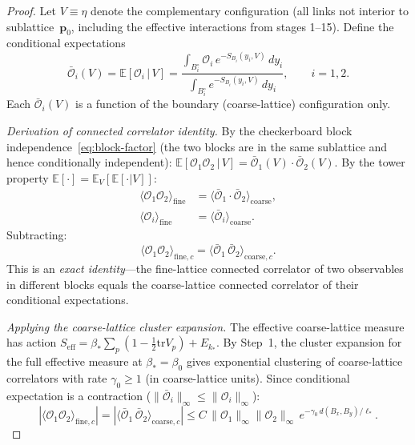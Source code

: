 \documentclass[11pt]{article}
\theoremstyle{definition}
\newcommand{\tr}{\mathrm{tr}}
\begin{document}
\begin{proof}
Let $V\equiv\eta$ denote the complementary configuration
(all links not interior to sublattice~$\mathbf{p}_0$,
including the effective interactions from stages 1--15).
Define the conditional expectations
\begin{equation}
\bar{\mathcal{O}}_i(V)
=\mathbb{E}[\mathcal{O}_i\,|\,V]
=\frac{\int_{B_i^\circ}\mathcal{O}_i\,
e^{-S_{B_i}(y_i,V)}\,dy_i}
{\int_{B_i^\circ}e^{-S_{B_i}(y_i,V)}\,dy_i},
\qquad i=1,2.
\end{equation}
Each $\bar{\mathcal{O}}_i(V)$ is a function of the boundary
(coarse-lattice) configuration only.

\emph{Derivation of connected correlator identity.}
By the checkerboard block independence~\eqref{eq:block-factor}
(the two blocks are in the same sublattice and hence
conditionally independent):
$\mathbb{E}[\mathcal{O}_1\mathcal{O}_2\,|\,V]
=\bar{\mathcal{O}}_1(V)\cdot\bar{\mathcal{O}}_2(V)$.
By the tower property
$\mathbb{E}[\cdot]=\mathbb{E}_V[\mathbb{E}[\cdot|V]]$:
\begin{align}
\langle\mathcal{O}_1\mathcal{O}_2\rangle_{\mathrm{fine}}
&=\langle\bar{\mathcal{O}}_1\cdot\bar{\mathcal{O}}_2
\rangle_{\mathrm{coarse}},\label{eq:tower-prod}\\
\langle\mathcal{O}_i\rangle_{\mathrm{fine}}
&=\langle\bar{\mathcal{O}}_i\rangle_{\mathrm{coarse}}.
\label{eq:tower-single}
\end{align}
Subtracting:
\begin{equation}\label{eq:fine-to-coarse}
\langle\mathcal{O}_1\mathcal{O}_2\rangle_{\mathrm{fine},c}
=\langle\bar{\mathcal{O}}_1\,\bar{\mathcal{O}}_2
\rangle_{\mathrm{coarse},c}.
\end{equation}
This is an \emph{exact identity}---the fine-lattice connected
correlator of two observables in different blocks equals the
coarse-lattice connected correlator of their conditional
expectations.

\emph{Applying the coarse-lattice cluster expansion.}
The effective coarse-lattice measure has action
$S_{\mathrm{eff}}=\beta_*\sum_p(1-\frac{1}{2}\tr V_p)+E_{k_*}$.
By Step~1, the cluster expansion for the full effective
measure at $\beta_*=\beta_0$ gives
exponential clustering of coarse-lattice correlators with
rate $\gamma_0\ge 1$ (in coarse-lattice units).
Since conditional expectation is a contraction
($\|\bar{\mathcal{O}}_i\|_\infty\le\|\mathcal{O}_i\|_\infty$):
\begin{equation}
|\langle\mathcal{O}_1\mathcal{O}_2\rangle_{\mathrm{fine},c}|
=|\langle\bar{\mathcal{O}}_1\,\bar{\mathcal{O}}_2
\rangle_{\mathrm{coarse},c}|
\le C\,\|\mathcal{O}_1\|_\infty\|\mathcal{O}_2\|_\infty\,
e^{-\gamma_0\,d(B_x,B_y)/\ell_*}.
\end{equation}


\end{proof}
\end{document}
